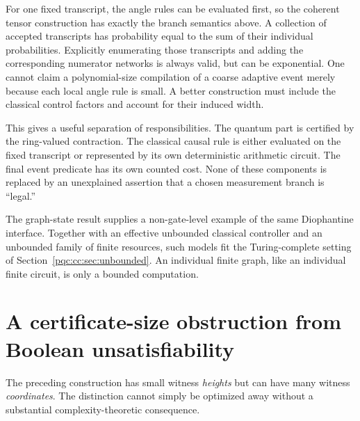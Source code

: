 \documentclass[11pt,letterpaper]{article}
\numberwithin{equation}{section}
\theoremstyle{definition}
\theoremstyle{remark}
\newcommand{\srcmark}[1]{\par\noindent{\small\itshape [source~#1]}\par}
\begin{document}
For one fixed transcript, the angle rules can be evaluated first, so the
coherent tensor construction has exactly the branch semantics above. A
collection of accepted transcripts has probability equal to the sum of their
individual probabilities. Explicitly enumerating those transcripts and adding
the corresponding numerator networks is always valid, but can be exponential.
One cannot claim a polynomial-size compilation of a coarse adaptive event
merely because each local angle rule is small. A better construction must
include the classical control factors and account for their induced width.

This gives a useful separation of responsibilities. The quantum part is
certified by the ring-valued contraction. The classical causal rule is either
evaluated on the fixed transcript or represented by its own deterministic
arithmetic circuit. The final event predicate has its own counted cost. None
of these components is replaced by an unexplained assertion that a chosen
measurement branch is ``legal.''

The graph-state result supplies a non-gate-level example of the same
Diophantine interface. Together with an effective unbounded classical
controller and an unbounded family of finite resources, such models fit the
Turing-complete setting of Section~\ref{pqc:cc:sec:unbounded}. An individual finite
graph, like an individual finite circuit, is only a bounded computation.

\section{A certificate-size obstruction from Boolean unsatisfiability}
\label{pqc:cc:sec:complexity}
\srcmark{10}

The preceding construction has small witness \emph{heights} but can have many
witness \emph{coordinates}. The distinction cannot simply be optimized away
without a substantial complexity-theoretic consequence.
\end{document}
